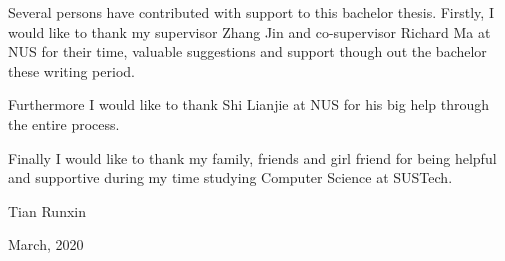 \begin{thanks}

Several persons have contributed with support to this bachelor thesis. Firstly, I would like to thank my supervisor Zhang Jin and co-supervisor Richard Ma at NUS for their time, valuable suggestions and support though out the bachelor these writing period.

Furthermore I would like to thank Shi Lianjie at NUS for his big help through the entire process.

Finally I would like to thank my family, friends and girl friend for being helpful and supportive during my time studying Computer Science at SUSTech.

\vskip 18pt

\begin{flushright}

Tian Runxin

March, 2020

\end{flushright}

\end{thanks}
